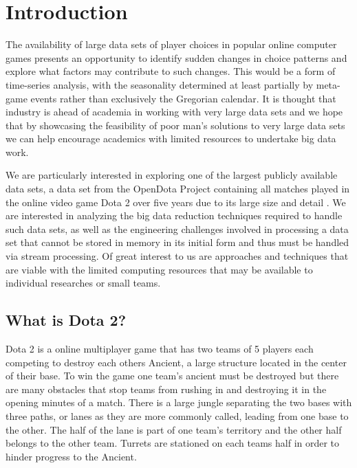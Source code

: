 \section{Introduction} %

The availability of large data sets of player choices in popular online computer games presents an opportunity to identify sudden changes in choice patterns and explore what factors may contribute to such changes. This would be a form of time-series analysis, with the seasonality determined at least partially by meta-game events rather than exclusively the Gregorian calendar. It is thought that industry is ahead of academia in working with very large data sets \cite{jinSignificanceChallengesBig2015} and we hope that by showcasing the feasibility of poor man's solutions to very large data sets we can help encourage academics with limited resources to undertake big data work.

We are particularly interested in exploring one of the largest publicly available data sets, a data set from the OpenDota Project \cite{theopendotaprojectFAQ2014} containing all matches played in the online video game Dota 2 over five years due to its large size and detail \cite{theopendotaprojectDataDumpMarch2017}. We are interested in analyzing the big data reduction techniques required to handle such data sets, as well as the engineering challenges involved in processing a data set that cannot be stored in memory in its initial form and thus must be handled via stream processing. Of great interest to us are approaches and techniques that are viable with the limited computing resources that may be available to individual researches or small teams.

\subsection{What is Dota 2?} %

Dota 2 is a online multiplayer game that has two teams of 5 players each competing to destroy each others Ancient, a large structure located in the center of their base. To win the game one team's ancient must be destroyed but there are many obstacles that stop teams from rushing in and destroying it in the opening minutes of a match. There is a large jungle separating the two bases with three paths, or lanes as they are more commonly called, leading from one base to the other. The half of the lane is part of one team's territory and the other half belongs to the other team. Turrets are stationed on each teams half in order to hinder progress to the Ancient.

